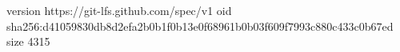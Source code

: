 version https://git-lfs.github.com/spec/v1
oid sha256:d41059830db8d2efa2b0b1f0b13e0f68961b0b03f609f7993c880c433c0b67ed
size 4315
